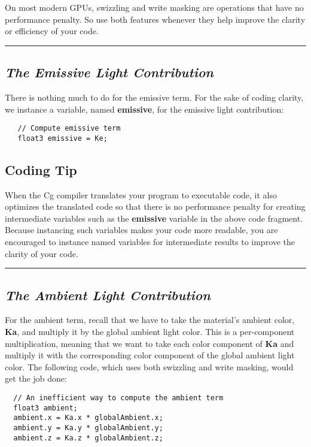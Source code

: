\documentclass[../main.tex]{subfiles}
\begin{document}
On most modern GPUs, swizzling and write masking are operations that have no performance penalty. So use both features whenever they help improve the clarity or efficiency of your code.
\hrule

\subsection*{\textit{The Emissive Light Contribution}}

There is nothing much to do for the emissive term. For the sake of coding clarity, we instance a variable, named \textbf{emissive}, for the emissive light contribution:

\FloatBarrier
\begin{lstlisting}
   // Compute emissive term
   float3 emissive = Ke;
\end{lstlisting}
\FloatBarrier

\subsection*{Coding Tip}

When the Cg compiler translates your program to executable code, it also optimizes the translated code so that there is no performance penalty for creating intermediate variables such as the \textbf{emissive} variable in the above code fragment. Because instancing such variables makes your code more readable, you are encouraged to instance named variables for intermediate results to improve the clarity of your code.
\hrule

\subsection*{\textit{The Ambient Light Contribution}}

For the ambient term, recall that we have to take the material's ambient color, \textbf{Ka}, and multiply it by the global ambient light color. This is a per-component multiplication, meaning that we want to take each color component of \textbf{Ka} and multiply it with the corresponding color component of the global ambient light color. The following code, which uses both swizzling and write masking, would get the job done:

\FloatBarrier
\begin{lstlisting}
  // An inefficient way to compute the ambient term
  float3 ambient;
  ambient.x = Ka.x * globalAmbient.x;
  ambient.y = Ka.y * globalAmbient.y;
  ambient.z = Ka.z * globalAmbient.z;
\end{lstlisting}
\FloatBarrier
\end{document}
